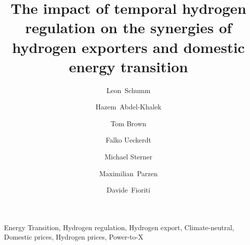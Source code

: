 \documentclass[5p,numafflabel]{elsarticle}
\begin{document}
\begin{frontmatter}

	\title{The impact of temporal hydrogen regulation on the synergies of hydrogen exporters and domestic energy transition}
    
	\author[oth,tub]{Leon~Schumm}
	\author[ieg,alu]{Hazem~Abdel-Khalek}
	\author[tub]{Tom Brown}
	\author[pik]{Falko Ueckerdt}
	\author[oth]{Michael Sterner}
	\author[uoe]{Maximilian~Parzen}
	\author[unipi]{Davide~Fioriti}



	\address[oth]{Research Center on Energy Transmission and Storage (FENES), Faculty of Electrical and Information Technology, University of Applied Sciences (OTH) Regensburg, Seybothstr. 2, 93053 Regensburg, Germany}
	\address[tub]{Department of Digital Transformation in Energy Systems, Institute of Energy Technology, Technische Universität Berlin, Fakultät III, Einsteinufer 25 (TA 8), 10587 Berlin, Germany\,}
	\address[ieg]{Fraunhofer Research Institution for Energy Infrastructures and Geothermal Systems IEG, Gulbener Straße 23, 03046 Cottbus, Germany}
	\address[alu]{Albert-Ludwigs Universität Freiburg, Faculty of Environment and Natural Resources, Tennenbacher Str. 4, 79106 Freiburg im Breisgau, Germany}
	\address[pik]{Potsdam Institute for Climate Impact Research, Telegrafenberg, 14473 Potsdam, Germany}
	\address[uoe]{University of Edinburgh, Institute for Energy Systems, EH9 3DW Edinburgh, United Kingdom}
	\address[unipi]{University of Pisa, Department of Energy Systems, Territory and Construction Engineering, Largo Lucio Lazzarino, 56122 Pisa, Italy}

	\begin{abstract}
		
	\end{abstract}

	\begin{keyword}
		Energy Transition, Hydrogen regulation, Hydrogen export, Climate-neutral, Domestic prices, Hydrogen prices, Power-to-X
	\end{keyword}




\end{frontmatter}
\end{document}
